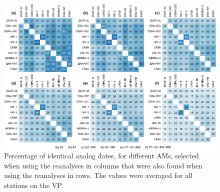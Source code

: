 \documentclass[alpha-refs]{wiley-article}
\begin{document}
\begin{figure}[bt]
	\centering
	\includegraphics[width=120mm]{figure-5.pdf}
	\caption{Percentage of identical analog dates, for different AMs, selected when using the reanalyses in columns that were also found when using the reanalyses in rows. The values were averaged for all stations on the VP.}
	\label{fig:shared-dates}
\end{figure}
\end{document}

